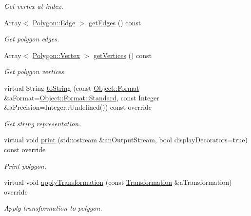 \begin{DoxyCompactItemize}
\begin{DoxyCompactList}\small\item\em Get vertex at index. \end{DoxyCompactList}\item 
Array$<$ \hyperlink{classlibrary_1_1math_1_1geom_1_1d2_1_1objects_1_1_polygon_a17e3083d71685e16f3244298e6f44ad9}{Polygon\+::\+Edge} $>$ \hyperlink{classlibrary_1_1math_1_1geom_1_1d2_1_1objects_1_1_polygon_a22fbf3d4f9553311497d20b9495841a7}{get\+Edges} () const
\begin{DoxyCompactList}\small\item\em Get polygon edges. \end{DoxyCompactList}\item 
Array$<$ \hyperlink{classlibrary_1_1math_1_1geom_1_1d2_1_1objects_1_1_polygon_a1559cddbcb23d41f2be9e389b0ccd127}{Polygon\+::\+Vertex} $>$ \hyperlink{classlibrary_1_1math_1_1geom_1_1d2_1_1objects_1_1_polygon_ae73d59e0e0bb5d13bd69e2924e602e20}{get\+Vertices} () const
\begin{DoxyCompactList}\small\item\em Get polygon vertices. \end{DoxyCompactList}\item 
virtual String \hyperlink{classlibrary_1_1math_1_1geom_1_1d2_1_1objects_1_1_polygon_acef17857f29323e985fba23441ed1171}{to\+String} (const \hyperlink{classlibrary_1_1math_1_1geom_1_1d2_1_1_object_ac8cd61dada4960cfee9a469231621b17}{Object\+::\+Format} \&a\+Format=\hyperlink{classlibrary_1_1math_1_1geom_1_1d2_1_1_object_ac8cd61dada4960cfee9a469231621b17aeb6d8ae6f20283755b339c0dc273988b}{Object\+::\+Format\+::\+Standard}, const Integer \&a\+Precision=Integer\+::\+Undefined()) const override
\begin{DoxyCompactList}\small\item\em Get string representation. \end{DoxyCompactList}\item 
virtual void \hyperlink{classlibrary_1_1math_1_1geom_1_1d2_1_1objects_1_1_polygon_a028ca7818387654ed1aab1584cee6cc5}{print} (std\+::ostream \&an\+Output\+Stream, bool display\+Decorators=true) const override
\begin{DoxyCompactList}\small\item\em Print polygon. \end{DoxyCompactList}\item 
virtual void \hyperlink{classlibrary_1_1math_1_1geom_1_1d2_1_1objects_1_1_polygon_a920b30eb110c7164f65754979da17638}{apply\+Transformation} (const \hyperlink{classlibrary_1_1math_1_1geom_1_1d2_1_1_transformation}{Transformation} \&a\+Transformation) override
\begin{DoxyCompactList}\small\item\em Apply transformation to polygon. \end{DoxyCompactList}\end{DoxyCompactItemize}
